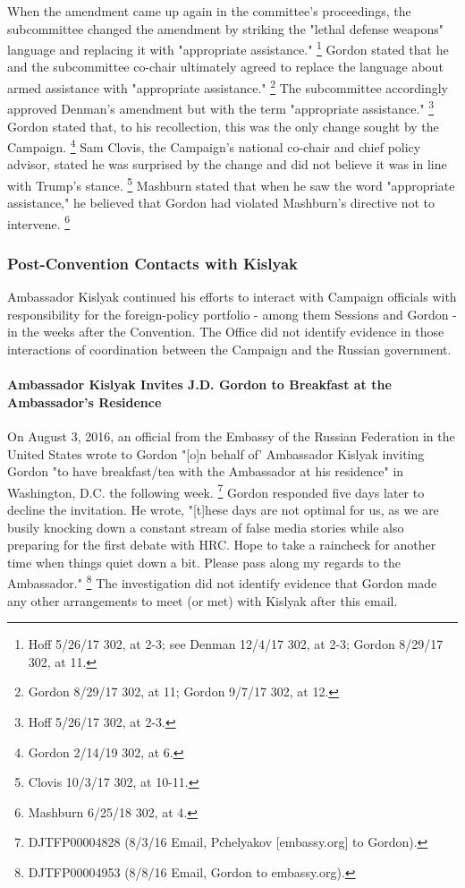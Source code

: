 When the amendment came up again in the committee's proceedings, the subcommittee changed the amendment by striking the "lethal defense weapons" language and replacing it with "appropriate assistance."%
\footnote{Hoff 5/26/17 302, at 2-3;
see Denman 12/4/17 302, at 2-3;
Gordon 8/29/17 302, at 11.}
Gordon stated that he and the subcommittee co-chair ultimately agreed to replace the language about armed assistance with "appropriate assistance."%
\footnote{Gordon 8/29/17 302, at 11;
Gordon 9/7/17 302, at 12.}
The subcommittee accordingly approved Denman's amendment but with the term "appropriate assistance."%
\footnote{Hoff 5/26/17 302, at 2-3.}
Gordon stated that, to his recollection, this was the only change sought by the Campaign.%
\footnote{Gordon 2/14/19 302, at 6.}
Sam Clovis, the Campaign's national co-chair and chief policy advisor, stated he was surprised by the change and did not believe it was in line with Trump's stance.%
\footnote{Clovis 10/3/17 302, at 10-11.}
Mashburn stated that when he saw the word "appropriate assistance," he believed that Gordon had violated Mashburn's directive not to intervene.%
\footnote{Mashburn 6/25/18 302, at 4.}

\subsubsection{Post-Convention Contacts with Kislyak}

Ambassador Kislyak continued his efforts to interact with Campaign officials with responsibility for the foreign-policy portfolio - among them Sessions and Gordon - in the weeks after the Convention.
The Office did not identify evidence in those interactions of coordination between the Campaign and the Russian government.

\paragraph{Ambassador Kislyak Invites J.D. Gordon to Breakfast at the Ambassador's Residence}

On August 3, 2016, an official from the Embassy of the Russian Federation in the United States wrote to Gordon "[o]n behalf of' Ambassador Kislyak inviting Gordon "to have breakfast/tea with the Ambassador at his residence" in Washington, D.C. the following week.%
\footnote{DJTFP00004828 (8/3/16 Email, Pchelyakov [embassy\@russianembassy.org] to Gordon).}
Gordon responded five days later to decline the invitation.
He wrote, "[t]hese days are not optimal for us, as we are busily knocking down a constant stream of false media stories while also preparing for the first debate with HRC.
Hope to take a raincheck for another time when things quiet down a bit.
Please pass along my regards to the Ambassador."%
\footnote{DJTFP00004953 (8/8/16 Email, Gordon to embassy\@russianembassy.org).}
The investigation did not identify evidence that Gordon made any other arrangements to meet (or met) with Kislyak after this email.

